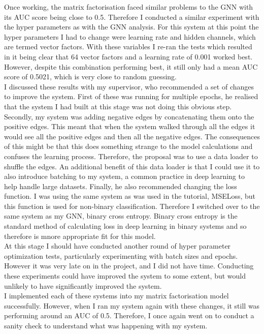 \documentclass{l4proj}
\begin{document}
Once working, the matrix factorisation faced similar problems to the GNN with its AUC score being close to 0.5. Therefore I conducted a similar experiment with the hyper parameters as with the GNN analysis. For this system at this point the hyper parameters I had to change were learning rate and hidden channels, which are termed vector factors. With these variables I re-ran the tests which resulted in it being clear that 64 vector factors and a learning rate of 0.001 worked best. However, despite this combination performing best, it still only had a mean AUC score of 0.5021, which is very close to random guessing. \\

I discussed these results with my supervisor, who recommended a set of changes to improve the system. First of these was running for multiple epochs, he realised that the system I had built at this stage was not doing this obvious step. Secondly, my system was adding negative edges by concatenating them onto the positive edges. This meant that when the system walked through all the edges it would see all the positive edges and then all the negative edges. The consequences of this might be that this does something strange to the model calculations and confuses the learning process. Therefore, the proposal was to use a data loader to shuffle the edges. An additional benefit of this data loader is that I could use it to also introduce batching to my system, a common practice in deep learning to help handle large datasets. Finally, he also recommended changing the loss function. I was using the same system as was used in the tutorial, MSELoss, but this function is used for non-binary classification. Therefore I switched over to the same system as my GNN, binary cross entropy. Binary cross entropy is the standard method of calculating loss in deep learning in binary systems and so therefore is mnore appropriate fit for this model.\\

At this stage I should have conducted another round of hyper parameter optimization tests, particularly experimenting with batch sizes and epochs. However it was very late on in the project, and I did not have time. Conducting these experiments could have improved the system to some extent, but would unlikely to have significantly improved the system. \\

I implemented each of these systems into my matrix factorisation model successfully. However, when I ran my system again with these changes, it still was performing around an AUC of 0.5. Therefore, I once again went on to conduct a sanity check to understand what was happening with my system. \\
\end{document}
